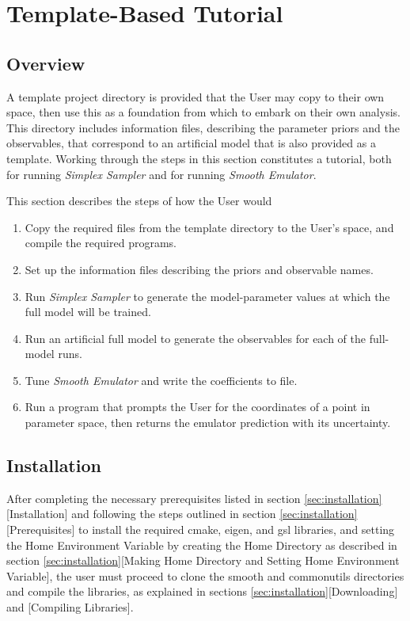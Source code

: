 \documentclass[UserManual.tex]{subfiles}
\begin{document}
\setcounter{section}{7}
\section{Template-Based Tutorial}\label{sec:tutorial}

\subsection{Overview}
A template project directory is provided that the User may copy to their own space, then use this as a foundation from which to embark on their own analysis. This directory includes information files, describing the parameter priors and the observables, that correspond to an artificial model that is also provided as a template. Working through the steps in this section constitutes a tutorial, both for running {\it Simplex Sampler} and for running {\it Smooth Emulator}.

This section describes the steps of how the User would
\begin{enumerate}\itemsep=0pt
\item Copy the required files from the template directory to the User's space, and compile the required programs.
\item Set up the information files describing the priors and observable names.
\item Run {\it Simplex Sampler} to generate the model-parameter values at which the full model will be trained.
\item Run an artificial full model to generate the observables for each of the full-model runs.
\item Tune {\it Smooth Emulator} and write the coefficients to file.
\item Run a program that prompts the User for the coordinates of a point in parameter space, then returns the emulator prediction with its uncertainty.
\end{enumerate}

\subsection{Installation}
After completing the necessary prerequisites listed in section \ref{sec:installation}[Installation] and following the steps outlined in section \ref{sec:installation}[Prerequisites] to install the required cmake, eigen, and gsl libraries, and setting the Home Environment Variable by creating the Home Directory as described in section \ref{sec:installation}[Making Home Directory and Setting Home Environment Variable], the user must proceed to clone the smooth and commonutils directories and compile the libraries, as explained in sections \ref{sec:installation}[Downloading] and [Compiling Libraries].
\end{document}
